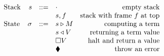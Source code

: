 \documentclass[../plutus-core-specification.tex]{subfiles}
\begin{document}
\begin{figure}[H]
\begin{subfigure}[c]{\linewidth}
    \centering
    \[\begin{array}{lrclr}
        \textrm{Stack} & s      & ::= & \cdot                             & \textrm{empty stack}\\
                       &        &     & s,f                               & \textrm{stack with frame $f$ at top}\\
        \textrm{State} & \sigma & ::= & s \triangleright M                  & \textrm{computing a term}\\
                       &        &     & s \triangleleft V                 & \textrm{returning a term value}\\
                       &        &     & \square V                         & \textrm{halt and return a value}\\
                       &        &     & \blacklozenge{}                        & \textrm{throw an error}
    \end{array}\]

    \label{fig:ck-frames}
\end{subfigure}


\begin{subfigure}[c]{\linewidth}


\end{subfigure}
\end{figure}
\end{document}
